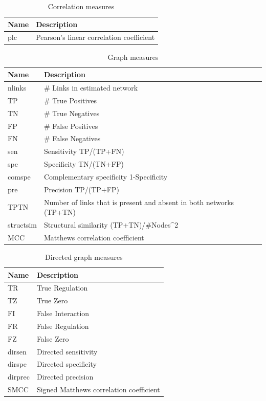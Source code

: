 \begin{bibunit}
\begin{table}[htb]
\caption{\label{tab:corr-measures}
Correlation measures}
\centering
\begin{tabular}{|l|p{8cm}|}
\hline
Name & Description\\
\hline
plc & Pearson's linear correlation coefficient\\
\hline
\end{tabular}
\end{table}

\begin{table}[htb]
\caption{\label{tab:graph-measures}
Graph measures}
\centering
\begin{tabular}{|l|p{8cm}|}
\hline
Name & Description\\
\hline
nlinks & \# Links in estimated network\\
TP & \# True Positives\\
TN & \# True Negatives\\
FP & \# False Positives\\
FN & \# False Negatives\\
sen & Sensitivity TP/(TP+FN)\\
spe & Specificity TN/(TN+FP)\\
comspe & Complementary specificity 1-Specificity\\
pre & Precision TP/(TP+FP)\\
TPTN & Number of links that is present and absent in both networks (TP+TN)\\
structsim & Structural similarity (TP+TN)/\#Nodes\^{}2\\
MCC & Matthews correlation coefficient\\
\hline
\end{tabular}
\end{table}


\begin{table}[htb]
\caption{\label{tab:dir-graph-measures}
Directed graph measures}
\centering
\begin{tabular}{|l|p{8cm}|}
\hline
Name & Description\\
\hline
TR & True Regulation\\
TZ & True Zero\\
FI & False Interaction\\
FR & False Regulation\\
FZ & False Zero\\
dirsen & Directed sensitivity\\
dirspe & Directed specificity\\
dirprec & Directed precision\\
SMCC & Signed Matthews correlation coefficient\\
\hline
\end{tabular}
\end{table}



\end{bibunit}
